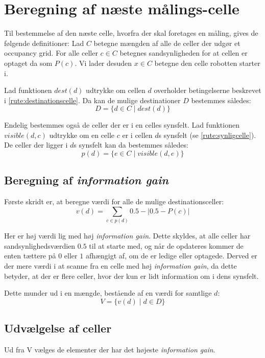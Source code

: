 \section{Beregning af næste målings-celle}\label{rute:mathintro}
Til bestemmelse af den næste celle, hvorfra der skal foretages en måling, gives de følgende definitioner:
Lad $C$ betegne mængden af alle de celler der udgør et occupancy grid.
For alle celler $c \in C$ betegnes sandsynligheden for at cellen er optaget da som $P(c)$.
Vi lader desuden $x \in C$ betegne den celle robotten starter i.

Lad funktionen $dest(d)$ udtrykke om cellen $d$ overholder betingelserne beskrevet i \cref{rute:destinationscelle}.
Da kan de mulige destinationer $D$ bestemmes således:
\begin{equation}D = \{ d \in C \mid dest(d) \}\end{equation}

Endelig bestemmes også de celler der er i en celles synsfelt.
Lad funktionen $visible(d, c)$ udtrykke om en celle $c$ er i cellen $d$s synsfelt (se \cref{rute:synligcelle}).
De celler der ligger i $d$s synsfelt kan da bestemmes således:
\begin{equation}p(d) = \{e \in C \mid visible(d, e)\}\end{equation}

\subsection{Beregning af \textit{information gain}}
Første skridt er, at beregne værdi for alle de mulige destinationsceller:
\begin{equation}
v(d) = \sum_{c \in p(d)} 0.5-|0.5 - P(c)|
\end{equation}

Her er høj værdi lig med høj \textit{information gain}.
Dette skyldes, at alle celler har sandsynlighedsværdien $0.5$ til at starte med, og når de opdateres kommer de enten tættere på $0$ eller $1$ afhængigt af, om de er ledige eller optagede.
Derved er der mere værdi i at scanne fra en celle med høj \textit{information gain}, da dette betyder, at der er flere celler, hvor der kun er lidt information om i dens synsfelt.

Dette munder ud i en mængde, bestående af en værdi for samtlige $d$:
\begin{equation}
V = \{ v(d) \mid d \in D \}
\end{equation}

\subsection{Udvælgelse af celler }
Ud fra V vælges de elementer der har det højeste \textit{information gain}. 


